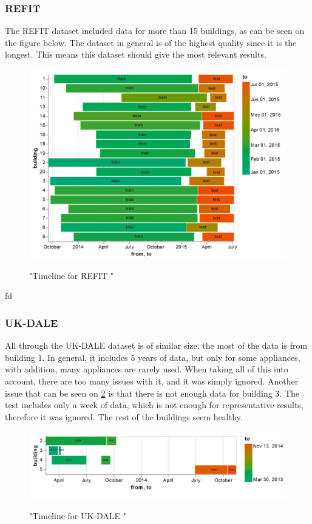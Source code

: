 \subsubsection{REFIT}
The REFIT dataset included data for more than 15 buildings, as can be seen on the figure below.
The dataset in general is of the highest quality since it is the longest. This means this dataset should give the most relevant results.
\begin{figure}[H]
	\centering
	\caption{"Timeline for REFIT "}
	\includegraphics[width=1\textwidth]{Figures/EC/refit_timeline.png}
	\label{fig:refit_timeline}
\end{figure}
fd
\subsubsection{UK-DALE} 

All through the UK-DALE dataset is of similar size, the most of the data is from building 1.
In general, it includes 5 years of data, but only for some appliances, with addition, many appliances are rarely used.
When taking all of this into account, there are too many issues with it, and it was simply ignored.
Another issue that can be seen on \ref{fig:ukdale_timeline} is that there is not enough data for 
building 3. The test includes only a week of data, which is not enough for representative results, therefore it was ignored.
The rest of the buildings seem healthy.

\begin{figure}[H]
	\centering
	\caption{"Timeline for UK-DALE "}
	\includegraphics[width=1\textwidth]{Figures/EC/ukdale_timeline.png}
	\label{fig:ukdale_timeline}
\end{figure}

